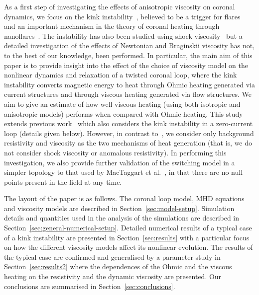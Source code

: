 As a first step of investigating the effects of anisotropic viscosity on coronal dynamics, we focus on the kink instability~\cite{hoodKinkInstabilitySolar1979, hoodCoronalHeatingMagnetic2009}, believed to be a trigger for flares~\cite{srivastavaObservationKinkInstability2010} and an important mechanism in the theory of coronal heating through nanoflares~\cite{browningHeatingCoronaNanoflares2008a}. The instability has also been studied using shock viscosity~\cite{hoodCoronalHeatingMagnetic2009,barefordShockHeatingNumerical2015} but a detailed investigation of the effects of Newtonian and Braginskii viscosity has not, to the best of our knowledge, been performed.
In particular, the main aim of this paper is to provide insight into the effect of the choice of viscosity model on the nonlinear dynamics and relaxation of a twisted coronal loop, where the kink instability converts magnetic energy to heat through Ohmic heating generated via current structures and through viscous heating generated via flow structures. We aim to give an estimate of how well viscous heating (using both isotropic and anisotropic models) performs when compared with Ohmic heating. This study extends previous work~\cite{hoodCoronalHeatingMagnetic2009} which also considers the kink instability in a zero-current loop (details given below). However, in contrast to~\cite{hoodCoronalHeatingMagnetic2009}, we consider only background resistivity and viscosity as the two mechanisms of heat generation (that is, we do not consider shock viscosity or anomalous resistivity). In performing this investigation, we also provide further validation of the switching model in a simpler topology to that used by MacTaggart et al.~\cite{mactaggartBraginskiiMagnetohydrodynamicsArbitrary2017}, in that there are no null points present in the field at any time.

The layout of the paper is as follows. The coronal loop model, MHD
equations and viscosity models are described in
Section~\ref{sec:model-setup}. Simulation details and quantities
  used in the analysis of the simulations are described in
  Section~\ref{sec:general-numerical-setup}. Detailed numerical
results of a typical case of a kink instability are presented in
Section~\ref{sec:results} with a particular focus on how the different
viscosity models affect its nonlinear evolution. The results of
the typical case are confirmed and generalised by a parameter
  study in Section~\ref{sec:results2} where the dependences of the
Ohmic and the viscous heating on the resistivity and the dynamic
viscosity are presented. Our conclusions are summarised in Section~\ref{sec:conclusions}.

